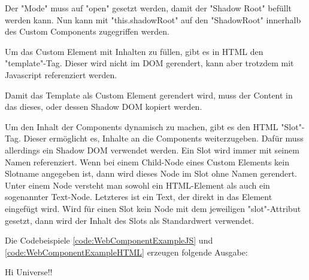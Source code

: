 
Der "Mode" muss auf "{\ttfamily open}" gesetzt werden, damit der "Shadow Root" befüllt werden kann. Nun kann mit "{\ttfamily this.shadowRoot}" auf den "ShadowRoot" innerhalb des Custom Components zugegriffen werden.
\cite{MDNShadowRoot}

\pagebreak
{}

Um das Custom Element mit Inhalten zu füllen, gibt es in HTML den "template"-Tag. Dieser wird nicht im DOM gerendert, kann aber trotzdem mit Javascript referenziert werden. \cite{MDNtemplate}


Damit das Template als Custom Element gerendert wird, muss der Content in das dieses, oder dessen Shadow DOM kopiert werden.



Um den Inhalt der Components dynamisch zu machen, gibt es den HTML "Slot"-Tag. 
Dieser ermöglicht es, Inhalte an die Components weiterzugeben. 
Dafür muss allerdings ein Shadow DOM verwendet werden. 
Ein Slot wird immer mit seinem Namen referenziert. 
Wenn bei einem Child-Node eines Custom Elements kein Slotname angegeben ist, dann wird dieses Node im Slot ohne Namen gerendert. 
Unter einem Node versteht man sowohl ein HTML-Element als auch ein sogenannter Text-Node. 
Letzteres ist ein Text, der direkt in das Element eingefügt wird. 
Wird für einen Slot kein Node mit dem jeweiligen "{\ttfamily slot}"-Attribut gesetzt, dann wird der Inhalt des Slots als Standardwert verwendet. 
\cite{MDNSlots}

\pagebreak
{}




Die Codebeispiele \ref{code:WebComponentExampleJS} und \ref{code:WebComponentExampleHTML} erzeugen folgende Ausgabe:

{\ttfamily Hi Universe!!}